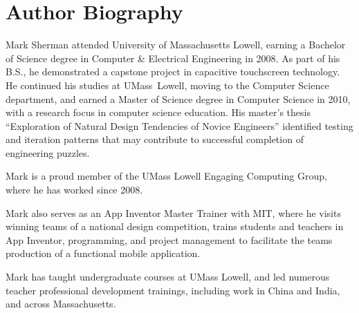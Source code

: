 \chapter{Author Biography}

Mark Sherman attended University of Massachusetts Lowell, earning a  Bachelor of Science degree in Computer \& Electrical Engineering in 2008. As part of his B.S., he demonstrated a capstone project in capacitive touchscreen technology. He continued his studies at UMass~Lowell, moving to the Computer Science department, and earned a Master of Science degree in Computer Science in 2010, with a research focus in computer science education. His master's thesis ``Exploration of Natural Design Tendencies of Novice Engineers'' identified testing and iteration patterns that may contribute to successful completion of engineering puzzles.

Mark is a proud member of the UMass Lowell Engaging Computing Group, where he has worked since 2008.

Mark also serves as an App Inventor Master Trainer with MIT, where he visits winning teams of a national design competition, trains students and teachers in App Inventor, programming, and project management to facilitate the teams production of a functional mobile application.

Mark has taught undergraduate courses at UMass Lowell, and led numerous teacher professional development trainings, including work in China and India, and across Massachusetts.
